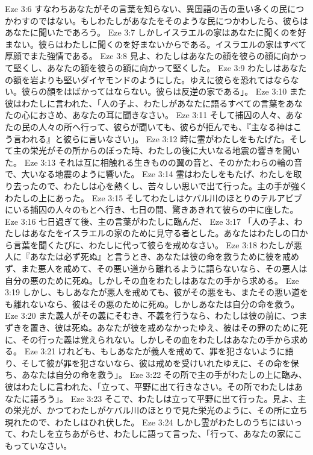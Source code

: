 Eze 3:6  すなわちあなたがその言葉を知らない、異国語の舌の重い多くの民につかわすのではない。もしわたしがあなたをそのような民につかわしたら、彼らはあなたに聞いたであろう。
Eze 3:7  しかしイスラエルの家はあなたに聞くのを好まない。彼らはわたしに聞くのを好まないからである。イスラエルの家はすべて厚顔でまた強情である。
Eze 3:8  見よ、わたしはあなたの顔を彼らの顔に向かって堅くし、あなたの額を彼らの額に向かって堅くした。
Eze 3:9  わたしはあなたの額を岩よりも堅いダイヤモンドのようにした。ゆえに彼らを恐れてはならない。彼らの顔をはばかってはならない。彼らは反逆の家である」。
Eze 3:10  また彼はわたしに言われた、「人の子よ、わたしがあなたに語るすべての言葉をあなたの心におさめ、あなたの耳に聞きなさい。
Eze 3:11  そして捕囚の人々、あなたの民の人々の所へ行って、彼らが聞いても、彼らが拒んでも、『主なる神はこう言われる』と彼らに言いなさい」。
Eze 3:12  時に霊がわたしをもたげた。そして主の栄光がその所からのぼった時、わたしの後に大いなる地震の響きを聞いた。
Eze 3:13  それは互に相触れる生きものの翼の音と、そのかたわらの輪の音で、大いなる地震のように響いた。
Eze 3:14  霊はわたしをもたげ、わたしを取り去ったので、わたしは心を熱くし、苦々しい思いで出て行った。主の手が強くわたしの上にあった。
Eze 3:15  そしてわたしはケバル川のほとりのテルアビブにいる捕囚の人々のもとへ行き、七日の間、驚きあきれて彼らの中に座した。
Eze 3:16  七日過ぎて後、主の言葉がわたしに臨んだ、
Eze 3:17  「人の子よ、わたしはあなたをイスラエルの家のために見守る者とした。あなたはわたしの口から言葉を聞くたびに、わたしに代って彼らを戒めなさい。
Eze 3:18  わたしが悪人に『あなたは必ず死ぬ』と言うとき、あなたは彼の命を救うために彼を戒めず、また悪人を戒めて、その悪い道から離れるように語らないなら、その悪人は自分の悪のために死ぬ。しかしその血をわたしはあなたの手から求める。
Eze 3:19  しかし、もしあなたが悪人を戒めても、彼がその悪をも、またその悪い道をも離れないなら、彼はその悪のために死ぬ。しかしあなたは自分の命を救う。
Eze 3:20  また義人がその義にそむき、不義を行うなら、わたしは彼の前に、つまずきを置き、彼は死ぬ。あなたが彼を戒めなかったゆえ、彼はその罪のために死に、その行った義は覚えられない。しかしその血をわたしはあなたの手から求める。
Eze 3:21  けれども、もしあなたが義人を戒めて、罪を犯さないように語り、そして彼が罪を犯さないなら、彼は戒めを受けいれたゆえに、その命を保ち、あなたは自分の命を救う」。
Eze 3:22  その所で主の手がわたしの上に臨み、彼はわたしに言われた、「立って、平野に出て行きなさい。その所でわたしはあなたに語ろう」。
Eze 3:23  そこで、わたしは立って平野に出て行った。見よ、主の栄光が、かつてわたしがケバル川のほとりで見た栄光のように、その所に立ち現れたので、わたしはひれ伏した。
Eze 3:24  しかし霊がわたしのうちにはいって、わたしを立ちあがらせ、わたしに語って言った、「行って、あなたの家にこもっていなさい。
